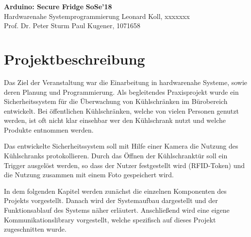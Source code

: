 \documentclass[a4paper, 11pt]{article}
\begin{document}
\noindent
\large\textbf{Arduino: Secure Fridge} \hfill \textbf{SoSe'18} \\
\normalsize Hardwarenahe Systemprogrammierung \hfill Leonard Koll, xxxxxxx \\
Prof. Dr. Peter Sturm \hfill Paul Kugener, 1071658

\section{Projektbeschreibung}
Das Ziel der Veranstaltung war die Einarbeitung in hardwarenahe Systeme, sowie deren Planung und Programmierung. Als begleitendes Praxisprojekt wurde ein Sicherheitssystem für die Überwachung von Kühlschränken im Bürobereich entwickelt. Bei öffentlichen Kühlschränken, welche von vielen Personen genutzt werden, ist oft nicht klar einsehbar wer den Kühlschrank nutzt und welche Produkte entnommen werden.

Das entwickelte Sicherheitssystem soll mit Hilfe einer Kamera die Nutzung des Kühlschranks protokollieren. Durch das Öffnen der Kühlschranktür soll ein Trigger ausgelöst werden, so dass der Nutzer festgestellt wird (RFID-Token) und die Nutzung zusammen mit einem Foto gespeichert wird.

In dem folgenden Kapitel werden zunächst die einzelnen Komponenten des Projekts vorgestellt. Danach wird der Systemaufbau dargestellt und der Funktionsablauf des Systems näher erläutert. Anschließend wird eine eigene Kommunikationslibrary vorgestellt, welche spezifisch auf dieses Projekt zugeschnitten wurde.
\end{document}
